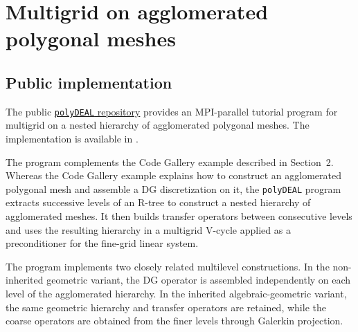 \documentclass[a4paper,12pt]{article}
\begin{document}
\section{Multigrid on agglomerated polygonal meshes}
\subsection{Public implementation}
The public \href{https://github.com/fdrmrc/polyDEAL}{\texttt{polyDEAL} repository} provides an MPI-parallel tutorial
program for multigrid on a nested hierarchy of agglomerated
polygonal meshes. The implementation is available in
\href{https://github.com/fdrmrc/polyDEAL/blob/main/examples/simplex_agglomerated_multigrid.cc}
{}.

The program complements the Code Gallery example described in
Section~2. Whereas the Code Gallery example explains how to construct
an agglomerated polygonal mesh and assemble a DG discretization
on it, the \texttt{polyDEAL} program extracts successive levels of an
R-tree to construct a nested hierarchy of agglomerated meshes. It then
builds transfer operators between consecutive levels and uses the
resulting hierarchy in a multigrid V-cycle applied as a preconditioner
for the fine-grid linear system.

The program implements two closely related multilevel constructions.
In the non-inherited geometric variant, the DG operator is assembled
independently on each level of the agglomerated hierarchy. In the
inherited algebraic-geometric variant, the same geometric hierarchy
and transfer operators are retained, while the coarse operators are
obtained from the finer levels through Galerkin projection.

\end{document}
